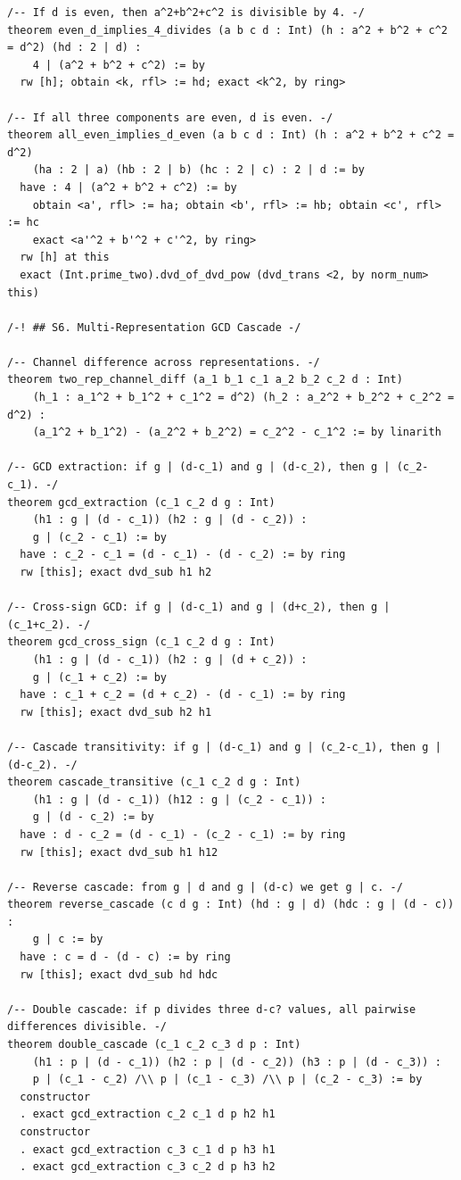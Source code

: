 \documentclass[11pt,openright,twoside]{book}
\theoremstyle{definition}
\begin{document}
\begin{lstlisting}[style=lean]
/-- If d is even, then a^2+b^2+c^2 is divisible by 4. -/
theorem even_d_implies_4_divides (a b c d : Int) (h : a^2 + b^2 + c^2 = d^2) (hd : 2 | d) :
    4 | (a^2 + b^2 + c^2) := by
  rw [h]; obtain <k, rfl> := hd; exact <k^2, by ring>

/-- If all three components are even, d is even. -/
theorem all_even_implies_d_even (a b c d : Int) (h : a^2 + b^2 + c^2 = d^2)
    (ha : 2 | a) (hb : 2 | b) (hc : 2 | c) : 2 | d := by
  have : 4 | (a^2 + b^2 + c^2) := by
    obtain <a', rfl> := ha; obtain <b', rfl> := hb; obtain <c', rfl> := hc
    exact <a'^2 + b'^2 + c'^2, by ring>
  rw [h] at this
  exact (Int.prime_two).dvd_of_dvd_pow (dvd_trans <2, by norm_num> this)

/-! ## S6. Multi-Representation GCD Cascade -/

/-- Channel difference across representations. -/
theorem two_rep_channel_diff (a_1 b_1 c_1 a_2 b_2 c_2 d : Int)
    (h_1 : a_1^2 + b_1^2 + c_1^2 = d^2) (h_2 : a_2^2 + b_2^2 + c_2^2 = d^2) :
    (a_1^2 + b_1^2) - (a_2^2 + b_2^2) = c_2^2 - c_1^2 := by linarith

/-- GCD extraction: if g | (d-c_1) and g | (d-c_2), then g | (c_2-c_1). -/
theorem gcd_extraction (c_1 c_2 d g : Int)
    (h1 : g | (d - c_1)) (h2 : g | (d - c_2)) :
    g | (c_2 - c_1) := by
  have : c_2 - c_1 = (d - c_1) - (d - c_2) := by ring
  rw [this]; exact dvd_sub h1 h2

/-- Cross-sign GCD: if g | (d-c_1) and g | (d+c_2), then g | (c_1+c_2). -/
theorem gcd_cross_sign (c_1 c_2 d g : Int)
    (h1 : g | (d - c_1)) (h2 : g | (d + c_2)) :
    g | (c_1 + c_2) := by
  have : c_1 + c_2 = (d + c_2) - (d - c_1) := by ring
  rw [this]; exact dvd_sub h2 h1

/-- Cascade transitivity: if g | (d-c_1) and g | (c_2-c_1), then g | (d-c_2). -/
theorem cascade_transitive (c_1 c_2 d g : Int)
    (h1 : g | (d - c_1)) (h12 : g | (c_2 - c_1)) :
    g | (d - c_2) := by
  have : d - c_2 = (d - c_1) - (c_2 - c_1) := by ring
  rw [this]; exact dvd_sub h1 h12

/-- Reverse cascade: from g | d and g | (d-c) we get g | c. -/
theorem reverse_cascade (c d g : Int) (hd : g | d) (hdc : g | (d - c)) :
    g | c := by
  have : c = d - (d - c) := by ring
  rw [this]; exact dvd_sub hd hdc

/-- Double cascade: if p divides three d-c? values, all pairwise differences divisible. -/
theorem double_cascade (c_1 c_2 c_3 d p : Int)
    (h1 : p | (d - c_1)) (h2 : p | (d - c_2)) (h3 : p | (d - c_3)) :
    p | (c_1 - c_2) /\\ p | (c_1 - c_3) /\\ p | (c_2 - c_3) := by
  constructor
  . exact gcd_extraction c_2 c_1 d p h2 h1
  constructor
  . exact gcd_extraction c_3 c_1 d p h3 h1
  . exact gcd_extraction c_3 c_2 d p h3 h2


\end{lstlisting}
\end{document}
